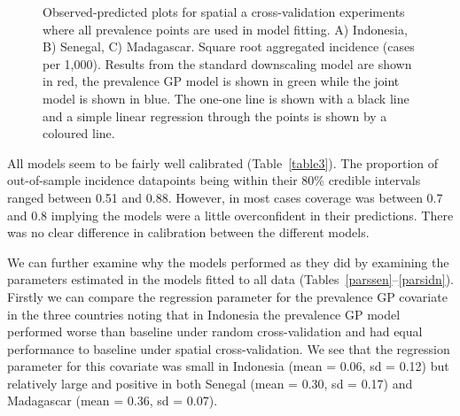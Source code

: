\documentclass{statsoc}
\begin{document}


\begin{figure}
\caption{\label{spatial2predobspolyfacet} Observed-predicted plots for spatial a cross-validation experiments where all prevalence points are used in model fitting.
A) Indonesia, B) Senegal, C) Madagascar. Square root aggregated incidence (cases per 1,000).
Results from the standard downscaling model are shown in red, the prevalence GP model is shown in green while the joint model is shown in blue.
The one-one line is shown with a black line and a simple linear regression through the points is shown by a coloured line.
}

\end{figure}




All models seem to be fairly well calibrated (Table~\ref{table3}).
The proportion of out-of-sample incidence datapoints being within their 80\% credible intervals ranged between 0.51 and 0.88.
However, in most cases coverage was between 0.7 and 0.8 implying the models were a little overconfident in their predictions.
There was no clear difference in calibration between the different models.


We can further examine why the models performed as they did by examining the parameters estimated in the models fitted to all data (Tables~\ref{parssen}--\ref{parsidn}).
Firstly we can compare the regression parameter for the prevalence GP covariate in the three countries noting that in Indonesia the prevalence GP model performed worse than baseline under random cross-validation and had equal performance to baseline under spatial cross-validation.
We see that the regression parameter for this covariate was small in Indonesia (mean = 0.06, sd = 0.12) but relatively large and positive in both Senegal (mean = 0.30, sd = 0.17) and Madagascar  (mean = 0.36, sd = 0.07).
\end{document}
